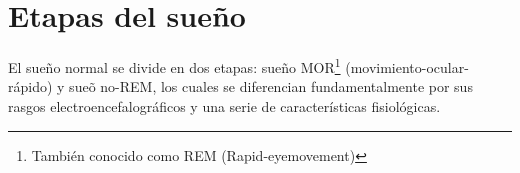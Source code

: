 


\section{Etapas del sue\~no}

El sue\~no normal se divide en dos etapas: sue\~no  MOR\footnote{Tambi\'en conocido como
REM (Rapid-eyemovement)} (movimiento-ocular-r\'apido) y sue\~o no-REM, los cuales se diferencian 
fundamentalmente por sus rasgos electroencefalogr\'aficos y una serie de caracter\'isticas 
fisiol\'ogicas\cite{AASM07}.



